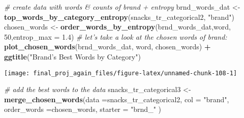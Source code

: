 \documentclass[
]{article}
\newenvironment{Shaded}{\begin{snugshade}}{\end{snugshade}}
\newcommand{\CommentTok}[1]{\textcolor[rgb]{0.56,0.35,0.01}{\textit{#1}}}
\newcommand{\DataTypeTok}[1]{\textcolor[rgb]{0.13,0.29,0.53}{#1}}
\newcommand{\DecValTok}[1]{\textcolor[rgb]{0.00,0.00,0.81}{#1}}
\newcommand{\FloatTok}[1]{\textcolor[rgb]{0.00,0.00,0.81}{#1}}
\newcommand{\KeywordTok}[1]{\textcolor[rgb]{0.13,0.29,0.53}{\textbf{#1}}}
\newcommand{\NormalTok}[1]{#1}
\newcommand{\OperatorTok}[1]{\textcolor[rgb]{0.81,0.36,0.00}{\textbf{#1}}}
\newcommand{\StringTok}[1]{\textcolor[rgb]{0.31,0.60,0.02}{#1}}
\begin{document}
\begin{Shaded}
\begin{Highlighting}[]
\CommentTok{# create data with words & counts of brand + entropy}
\NormalTok{brnd_words_dat <-}\StringTok{ }\KeywordTok{top_words_by_category_entropy}\NormalTok{(snacks_tr_categorical2, }\StringTok{"brand"}\NormalTok{)}
\NormalTok{chosen_words <-}\StringTok{ }\KeywordTok{order_words_by_entropy}\NormalTok{(brnd_words_dat,word, }\DecValTok{50}\NormalTok{,}\DataTypeTok{entrop_max =}  \FloatTok{1.4}\NormalTok{)}
\CommentTok{# let's take a look at the chosen words of brand:}
\KeywordTok{plot_chosen_words}\NormalTok{(brnd_words_dat, word, chosen_words) }\OperatorTok{+}\StringTok{ }\KeywordTok{ggtitle}\NormalTok{(}\StringTok{"Brand's Best Words by Category"}\NormalTok{)}
\end{Highlighting}
\end{Shaded}

\begin{center}\texttt{[image: final\_proj\_again\_files/figure-latex/unnamed-chunk-108-1]} \end{center}

\begin{Shaded}
\begin{Highlighting}[]
\CommentTok{# add the best words to the data}
\NormalTok{snacks_tr_categorical3 <-}\StringTok{ }\KeywordTok{merge_chosen_words}\NormalTok{(}\DataTypeTok{data =}\NormalTok{snacks_tr_categorical2, }\DataTypeTok{col =} \StringTok{"brand"}\NormalTok{, }
                                             \DataTypeTok{order_words =}\NormalTok{chosen_words, }\DataTypeTok{starter =} \StringTok{"brnd_"}\NormalTok{  )}
\end{Highlighting}
\end{Shaded}
\end{document}
